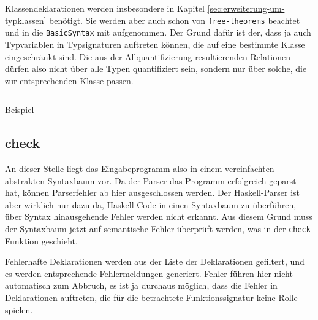 Klassendeklarationen werden insbesondere in Kapitel \ref{sec:erweiterung-um-typklassen} benötigt. Sie werden aber auch schon
von \texttt{free-theorems} beachtet und in die \texttt{BasicSyntax} mit aufgenommen. Der Grund dafür ist der, dass ja auch
Typvariablen in Typsignaturen auftreten können, die auf eine bestimmte Klasse eingeschränkt sind. Die aus der Allquantifizierung
resultierenden Relationen dürfen also nicht über alle Typen quantifiziert sein, sondern nur über solche, die zur entsprechenden
Klasse passen.


\begin{listing}[ht]
\inputminted[tabsize=2]{haskell}{ast2.hs}
\caption{Beispiel}
\label{lst:ast-data}
\end{listing}


\subsection{check}

\label{sec:check}

An dieser Stelle liegt das Eingabeprogramm also in einem vereinfachten abstrakten Syntaxbaum vor. Da der Parser das Programm
erfolgreich geparst hat, können Parserfehler ab hier ausgeschlossen werden. Der Haskell-Parser ist aber wirklich nur dazu da,
Haskell-Code in einen Syntaxbaum zu überführen, über Syntax hinausgehende Fehler werden nicht erkannt. Aus diesem Grund
muss der Syntaxbaum jetzt auf semantische Fehler überprüft werden, was in der \texttt{check}-Funktion geschieht.

Fehlerhafte Deklarationen werden aus der Liste der Deklarationen gefiltert, und es werden entsprechende Fehlermeldungen
generiert. Fehler führen hier nicht automatisch zum Abbruch, es ist ja durchaus möglich, dass die Fehler in Deklarationen
auftreten, die für die betrachtete Funktionssignatur keine Rolle spielen.

